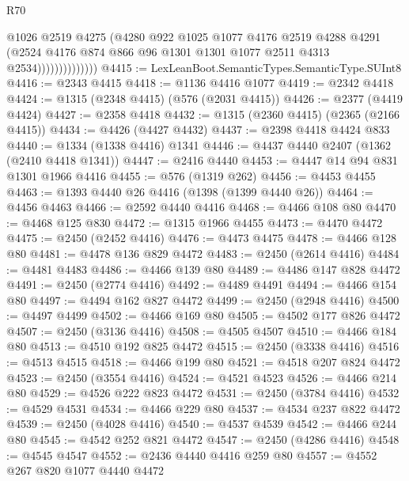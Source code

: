 \begin{lexlean}{R70}
\begin{coremodule}
                            @1026
                            @2519
                            @4275
                            (@4280
                              @922
                              @1025
                              @1077
                              @4176
                              @2519
                              @4288
                              @4291
                              (@2524
                                @4176
                                @874
                                @866
                                @96
                                @1301
                                @1301
                                @1077
                                @2511
                                @4313
                                @2534))))))))))))))
@4415 := LexLeanBoot.SemanticTypes.SemanticType.SUInt8
@4416 := @2343 @4415
@4418 := @1136 @4416 @1077
@4419 := @2342 @4418
@4424 := @1315 (@2348 @4415) (@576 (@2031 @4415))
@4426 := @2377 (@4419 @4424)
@4427 := @2358 @4418
@4432 := @1315 (@2360 @4415) (@2365 (@2166 @4415))
@4434 := @4426 (@4427 @4432)
@4437 := @2398 @4418 @4424 @833
@4440 := @1334 (@1338 @4416) @1341
@4446 := @4437 @4440 @2407 (@1362 (@2410 @4418 @1341))
@4447 := @2416 @4440
@4453 := @4447 @14 @94 @831 @1301 @1966 @4416
@4455 := @576 (@1319 @262)
@4456 := @4453 @4455
@4463 := @1393 @4440 @26 @4416 (@1398 (@1399 @4440 @26))
@4464 := @4456 @4463
@4466 := @2592 @4440 @4416
@4468 := @4466 @108 @80
@4470 := @4468 @125 @830
@4472 := @1315 @1966 @4455
@4473 := @4470 @4472
@4475 := @2450 (@2452 @4416)
@4476 := @4473 @4475
@4478 := @4466 @128 @80
@4481 := @4478 @136 @829 @4472
@4483 := @2450 (@2614 @4416)
@4484 := @4481 @4483
@4486 := @4466 @139 @80
@4489 := @4486 @147 @828 @4472
@4491 := @2450 (@2774 @4416)
@4492 := @4489 @4491
@4494 := @4466 @154 @80
@4497 := @4494 @162 @827 @4472
@4499 := @2450 (@2948 @4416)
@4500 := @4497 @4499
@4502 := @4466 @169 @80
@4505 := @4502 @177 @826 @4472
@4507 := @2450 (@3136 @4416)
@4508 := @4505 @4507
@4510 := @4466 @184 @80
@4513 := @4510 @192 @825 @4472
@4515 := @2450 (@3338 @4416)
@4516 := @4513 @4515
@4518 := @4466 @199 @80
@4521 := @4518 @207 @824 @4472
@4523 := @2450 (@3554 @4416)
@4524 := @4521 @4523
@4526 := @4466 @214 @80
@4529 := @4526 @222 @823 @4472
@4531 := @2450 (@3784 @4416)
@4532 := @4529 @4531
@4534 := @4466 @229 @80
@4537 := @4534 @237 @822 @4472
@4539 := @2450 (@4028 @4416)
@4540 := @4537 @4539
@4542 := @4466 @244 @80
@4545 := @4542 @252 @821 @4472
@4547 := @2450 (@4286 @4416)
@4548 := @4545 @4547
@4552 := @2436 @4440 @4416 @259 @80
@4557 := @4552 @267 @820 @1077 @4440 @4472

\end{coremodule}
\end{lexlean}
